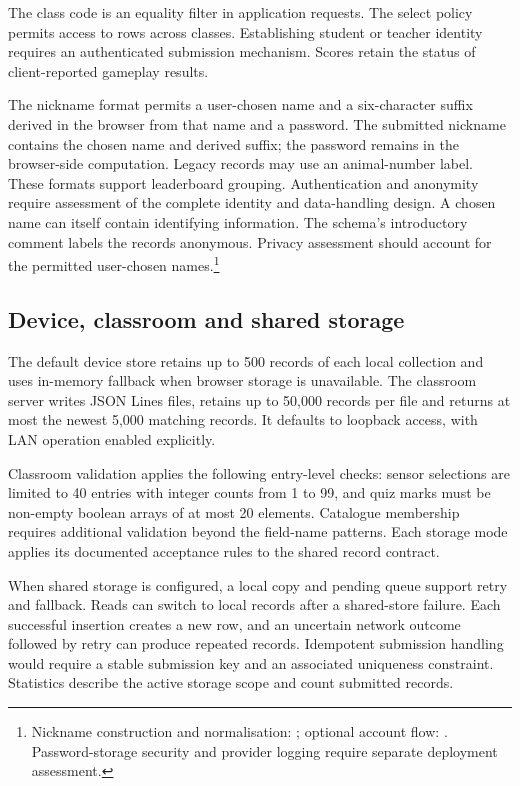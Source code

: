 \documentclass[10pt,a4paper]{article}
\begin{document}
The class code is an equality filter in application requests. The select policy permits access to rows across classes. Establishing student or teacher identity requires an authenticated submission mechanism. Scores retain the status of client-reported gameplay results.

The nickname format permits a user-chosen name and a six-character suffix derived in the browser from that name and a password. The submitted nickname contains the chosen name and derived suffix; the password remains in the browser-side computation. Legacy records may use an animal-number label. These formats support leaderboard grouping. Authentication and anonymity require assessment of the complete identity and data-handling design. A chosen name can itself contain identifying information. The schema's introductory comment labels the records anonymous. Privacy assessment should account for the permitted user-chosen names.\footnote{Nickname construction and normalisation: ; optional account flow: . Password-storage security and provider logging require separate deployment assessment.}

\subsection{Device, classroom and shared storage}
The default device store retains up to 500 records of each local collection and uses in-memory fallback when browser storage is unavailable. The classroom server writes JSON Lines files, retains up to 50,000 records per file and returns at most the newest 5,000 matching records. It defaults to loopback access, with LAN operation enabled explicitly.

Classroom validation applies the following entry-level checks: sensor selections are limited to 40 entries with integer counts from 1 to 99, and quiz marks must be non-empty boolean arrays of at most 20 elements. Catalogue membership requires additional validation beyond the field-name patterns. Each storage mode applies its documented acceptance rules to the shared record contract.

When shared storage is configured, a local copy and pending queue support retry and fallback. Reads can switch to local records after a shared-store failure. Each successful insertion creates a new row, and an uncertain network outcome followed by retry can produce repeated records. Idempotent submission handling would require a stable submission key and an associated uniqueness constraint. Statistics describe the active storage scope and count submitted records.
\end{document}
